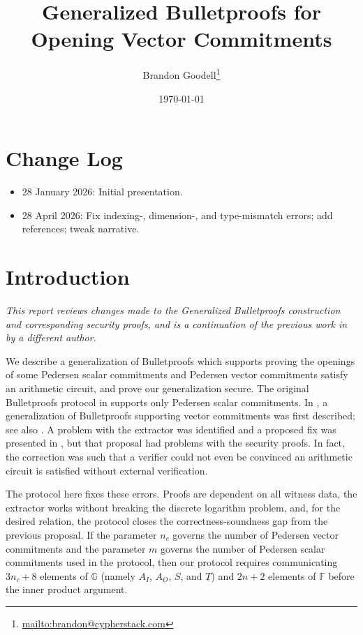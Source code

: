 \documentclass{article}
\title{Generalized Bulletproofs for Opening Vector Commitments}
\author{Brandon Goodell\thanks{\url{mailto:brandon@cypherstack.com}}}
\date{\today}
\theoremstyle{definition}
\newcommand{\GG}{\mathbb{G}}
\newcommand{\FF}{\mathbb{F}}
\begin{document}
\maketitle

\tableofcontents
\linenumbers

\section*{Change Log}
\begin{itemize}
\item 28 January 2026: Initial presentation.
\item 28 April 2026: Fix indexing-, dimension-, and type-mismatch errors; add references; tweak narrative.
\end{itemize}

\section{Introduction}


\textit{This report reviews changes made to the Generalized Bulletproofs construction and corresponding security proofs, and is a continuation of the previous work in \cite{aaron} by a different author.}


We describe a generalization of Bulletproofs which supports proving the openings of some Pedersen scalar commitments  and Pedersen vector commitments \cite{pedersen1991non} satisfy an arithmetic circuit, and prove our generalization secure. The original Bulletproofs protocol in \cite{bp} supports only Pedersen scalar commitments. In \cite{curvetrees}, a generalization of Bulletproofs supporting vector commitments was first described; see also \cite{repo}. A problem with the extractor was identified and a proposed fix was presented in \cite{aaron}, but that proposal had problems with the security proofs. In fact, the correction was such that a verifier could not even be convinced an arithmetic circuit is satisfied without external verification.


The protocol here fixes these errors. Proofs are dependent on all witness data, the extractor works without breaking the discrete logarithm problem, and, for the desired relation, the protocol closes the correctness-soundness gap from the previous proposal. If the parameter $n_c$ governs the number of Pedersen vector commitments and the parameter $m$ governs the number of Pedersen scalar commitments used in the protocol, then our protocol requires communicating $3n_c+8$ elements of $\GG$ (namely $A_I$, $A_O$, $S$, and $\underline{T}$) and $2n+2$  elements of $\FF$ before the inner product argument.
\end{document}
